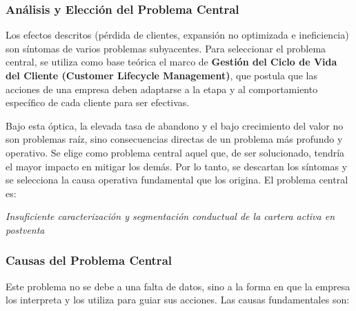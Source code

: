 
\subsubsection{Análisis y Elección del Problema Central}
Los efectos descritos (pérdida de clientes, expansión no optimizada e ineficiencia) son síntomas de varios problemas subyacentes. Para seleccionar el problema central, se utiliza como base teórica el marco de \textbf{Gestión del Ciclo de Vida del Cliente (Customer Lifecycle Management)}, que postula que las acciones de una empresa deben adaptarse a la etapa y al comportamiento específico de cada cliente para ser efectivas.

Bajo esta óptica, la elevada tasa de abandono y el bajo crecimiento del valor no son problemas raíz, sino consecuencias directas de un problema más profundo y operativo. Se elige como problema central aquel que, de ser solucionado, tendría el mayor impacto en mitigar los demás. Por lo tanto, se descartan los síntomas y se selecciona la causa operativa fundamental que los origina. El problema central es:

\begin{center}
    \textit{Insuficiente caracterización y segmentación conductual de la cartera activa en postventa}
\end{center}

\subsubsection{Causas del Problema Central}
Este problema no se debe a una falta de datos, sino a la forma en que la empresa los interpreta y los utiliza para guiar sus acciones. Las causas fundamentales son:

